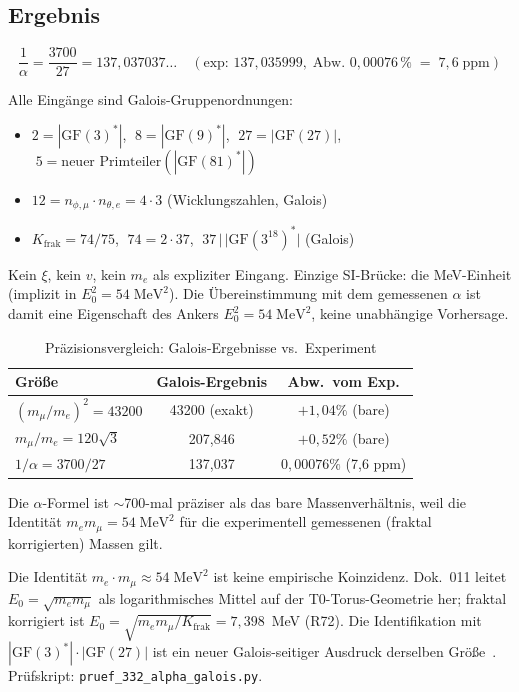 \subsection{Ergebnis}

\begin{equation}
\boxed{
  \frac{1}{\alpha} = \frac{3700}{27} = 137{,}037037\ldots
  \quad (\text{exp: }137{,}035999,\;\text{Abw. }0{,}00076\,\%\;=\;7{,}6\;\text{ppm})
}
\end{equation}

Alle Eingänge sind Galois-Gruppenordnungen:
\begin{itemize}
  \item $2 = |\text{GF}(3)^*|$, $\;8 = |\text{GF}(9)^*|$,
        $\;27 = |\text{GF}(27)|$, $\;5 = \text{neuer Primteiler}(|\text{GF}(81)^*|)$
  \item $12 = n_{\phi,\mu} \cdot n_{\theta,e} = 4 \cdot 3$ (Wicklungszahlen, Galois)
  \item $K_\text{frak} = 74/75$, $\;74 = 2 \cdot 37$,
        $\;37\,|\,|\text{GF}(3^{18})^*|$ (Galois)
\end{itemize}
Kein $\xi$, kein $v$, kein $m_e$ als expliziter Eingang.
Einzige SI-Brücke: die MeV-Einheit (implizit in $E_0^2 = 54\;\text{MeV}^2$).
Die Übereinstimmung mit dem gemessenen $\alpha$ ist damit eine Eigenschaft
des Ankers $E_0^2 = 54\;\text{MeV}^2$, keine unabhängige Vorhersage.

\begin{table}[H]
\centering
\caption{Präzisionsvergleich: Galois-Ergebnisse vs.\ Experiment}
\begin{tabular}{lcc}
\toprule
Größe & Galois-Ergebnis & Abw.\ vom Exp. \\
\midrule
$(m_\mu/m_e)^2 = 43200$ & 43200 (exakt) & $+1{,}04\%$ (bare) \\
$m_\mu/m_e = 120\sqrt{3}$ & 207{,}846 & $+0{,}52\%$ (bare) \\
$1/\alpha = 3700/27$ & 137{,}037 & $0{,}00076\%$ (7{,}6 ppm) \\
\bottomrule
\end{tabular}
\end{table}

Die $\alpha$-Formel ist $\sim$700-mal präziser als das bare Massenverhältnis,
weil die Identität $m_e m_\mu = 54\;\text{MeV}^2$ für die experimentell
gemessenen (fraktal korrigierten) Massen gilt.

Die Identität $m_e \cdot m_\mu \approx 54\;\text{MeV}^2$ ist keine empirische
Koinzidenz. Dok.~011 leitet $E_0 = \sqrt{m_e m_\mu}$ als logarithmisches
Mittel auf der T0-Torus-Geometrie her; fraktal korrigiert ist $E_0 = \sqrt{m_e m_\mu/K_{\text{frak}}} = 7{,}398$~MeV (R72). Die Identifikation mit
$|\text{GF}(3)^*|\cdot|\text{GF}(27)|$ ist ein neuer Galois-seitiger
Ausdruck derselben Größe~\KM.
Prüfskript: \texttt{pruef\_332\_alpha\_galois.py}.

